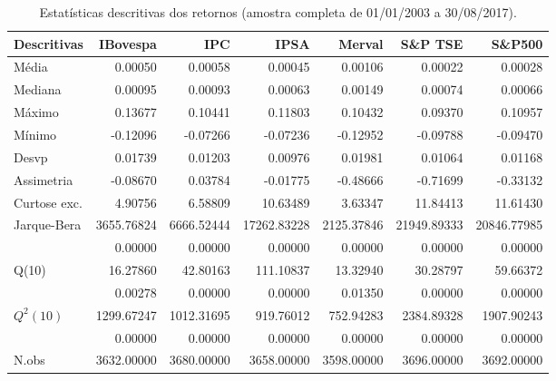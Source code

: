 \begin{table}[H]
\centering
\caption{Estatísticas descritivas dos retornos (amostra completa de 01/01/2003 a 30/08/2017).} 
\label{tab:descritivas}
\begin{tabular}{lrrrrrr}
  \hline
Descritivas & IBovespa & IPC & IPSA & Merval & S\&P TSE & S\&P500 \\ 
  \hline
Média & 0.00050 & 0.00058 & 0.00045 & 0.00106 & 0.00022 & 0.00028 \\ 
  Mediana & 0.00095 & 0.00093 & 0.00063 & 0.00149 & 0.00074 & 0.00066 \\ 
  Máximo & 0.13677 & 0.10441 & 0.11803 & 0.10432 & 0.09370 & 0.10957 \\ 
  Mínimo & -0.12096 & -0.07266 & -0.07236 & -0.12952 & -0.09788 & -0.09470 \\ 
  Desvp & 0.01739 & 0.01203 & 0.00976 & 0.01981 & 0.01064 & 0.01168 \\ 
  Assimetria & -0.08670 & 0.03784 & -0.01775 & -0.48666 & -0.71699 & -0.33132 \\ 
  Curtose exc. & 4.90756 & 6.58809 & 10.63489 & 3.63347 & 11.84413 & 11.61430 \\ 
  Jarque-Bera & 3655.76824 & 6666.52444 & 17262.83228 & 2125.37846 & 21949.89333 & 20846.77985 \\ 
   & 0.00000 & 0.00000 & 0.00000 & 0.00000 & 0.00000 & 0.00000 \\ 
  Q(10) & 16.27860 & 42.80163 & 111.10837 & 13.32940 & 30.28797 & 59.66372 \\ 
   & 0.00278 & 0.00000 & 0.00000 & 0.01350 & 0.00000 & 0.00000 \\ 
  $Q^2(10)$ & 1299.67247 & 1012.31695 & 919.76012 & 752.94283 & 2384.89328 & 1907.90243 \\ 
   & 0.00000 & 0.00000 & 0.00000 & 0.00000 & 0.00000 & 0.00000 \\ 
  N.obs & 3632.00000 & 3680.00000 & 3658.00000 & 3598.00000 & 3696.00000 & 3692.00000 \\ 
   \hline
\end{tabular}
\end{table}
